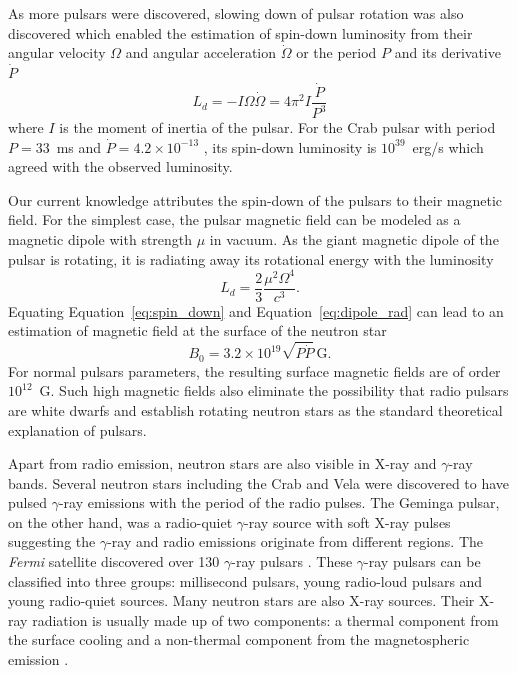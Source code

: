 As more pulsars were discovered, slowing down of pulsar rotation was also discovered which enabled the estimation of spin-down luminosity from their angular velocity $\Omega$ and angular acceleration $\dot{\Omega}$ or the period $P$ and its derivative $\dot{P}$
%
\begin{equation}\label{eq:spin_down}
	  L_{d} = -I\Omega\dot{\Omega} = 4\pi^2 I\frac{\dot{P}}{P^3}
\end{equation}
%
where $I$ is the moment of inertia of the pulsar.
For the Crab pulsar with period $P=33$~ms and $\dot{P}=4.2\times 10^{-13}$ \citep{1968IAUC.2113....1L}, its spin-down luminosity is $10^{39}$~erg/s which agreed with the observed luminosity.

Our current knowledge attributes the spin-down of the pulsars to their magnetic field. For the simplest case, the pulsar magnetic field can be modeled as a magnetic dipole with strength $\mu$ in vacuum.
As the giant magnetic dipole of the pulsar is rotating, it is radiating away its rotational energy with the luminosity
%
\begin{equation}\label{eq:dipole_rad}
	L_{d} = \frac{2}{3}\frac{\mu^2\Omega^4}{c^3}.
\end{equation}
%
Equating Equation~\ref{eq:spin_down}  and Equation~\ref{eq:dipole_rad} can lead to an estimation of magnetic field at the surface of the neutron star
%
\begin{equation}
		B_0 = 3.2\times 10^{19}\sqrt{P \dot{P}}\,\mathrm{G}.
\end{equation}
%
For normal pulsars parameters, the resulting surface magnetic fields are of order $10^{12}$~G.
Such high magnetic fields also eliminate the possibility that radio pulsars are white dwarfs and establish rotating neutron stars as the standard theoretical explanation of pulsars.

Apart from radio emission, neutron stars are also visible in X-ray and $\gamma$-ray bands. Several neutron stars including the Crab \citep{1974Natur.251..397K} and Vela \citep{1975ApJ...200L..79T} were discovered to have pulsed $\gamma$-ray emissions with the period of the radio pulses. 
The Geminga pulsar, on the other hand, was a radio-quiet $\gamma$-ray source with soft X-ray pulses \citep{1992Natur.357..222H} suggesting the $\gamma$-ray and radio emissions originate from different regions.
The {\it Fermi} satellite discovered over 130 $\gamma$-ray pulsars \citep{2010ApJS..188..405A}.
These $\gamma$-ray pulsars can be classified into three groups: millisecond pulsars, young radio-loud pulsars and young radio-quiet sources.
 Many neutron stars are also X-ray sources. Their X-ray radiation is usually made up of two components: a thermal component from the surface cooling and a non-thermal component from the magnetospheric emission \citep{2006csxs.book..279K}.
 

